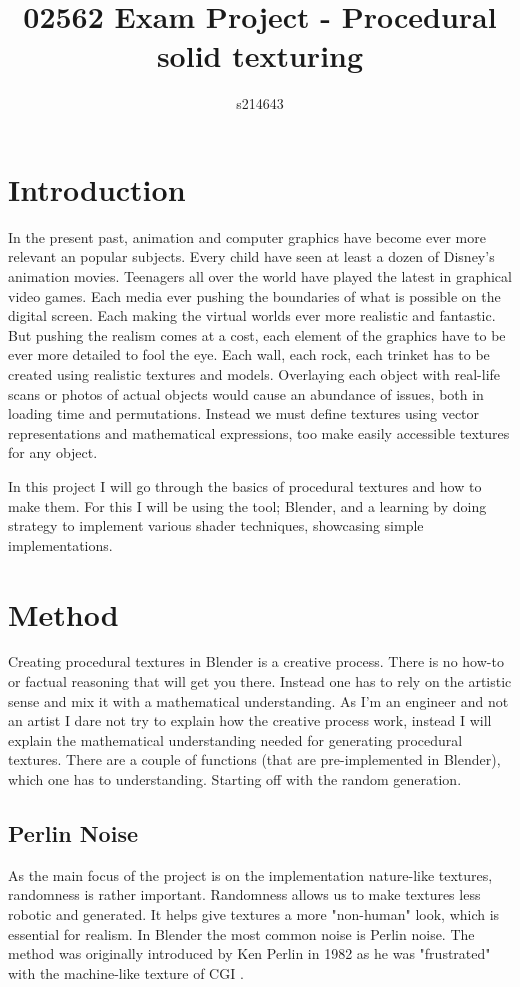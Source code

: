 \documentclass[a4paper, 12pt]{olplainarticle}
\title{02562 Exam Project - Procedural solid texturing}
\author[1]{s214643}
\begin{document}
 

\flushbottom
\maketitle 

\section{Introduction}
In the present past, animation and computer graphics have become ever more relevant an popular subjects. 
Every child have seen at least a dozen of Disney's animation movies. Teenagers all over the world have played the latest in graphical video games.
Each media ever pushing the boundaries of what is possible on the digital screen. Each making the virtual worlds ever more realistic and fantastic.
But pushing the realism comes at a cost, each element of the graphics have to be ever more detailed to fool the eye. 
Each wall, each rock, each trinket has to be created using realistic textures and models. Overlaying each object with real-life scans or photos of actual objects would cause an abundance of issues, both in loading time and permutations.
Instead we must define textures using vector representations and mathematical expressions, too make easily accessible textures for any object.

In this project I will go through the basics of procedural textures and how to make them. 
For this I will be using the tool; Blender, and a learning by doing strategy to implement various shader techniques, showcasing simple implementations.

\section{Method}
Creating procedural textures in Blender is a creative process. There is no how-to or factual reasoning that will get you there. 
Instead one has to rely on the artistic sense and mix it with a mathematical understanding. 
As I'm an engineer and not an artist I dare not try to explain how the creative process work, instead I will explain the mathematical understanding needed for generating procedural textures.
There are a couple of functions (that are pre-implemented in Blender), which one has to understanding. Starting off with the random generation.

\subsection{Perlin Noise}
As the main focus of the project is on the implementation nature-like textures, randomness is rather important.
Randomness allows us to make textures less robotic and generated. It helps give textures a more "non-human" look, which is essential for realism.
In Blender the most common noise is Perlin noise. The method was originally introduced by Ken Perlin in 1982 as he was "frustrated" with the machine-like texture of CGI \citep{perlin}.
\end{document}
